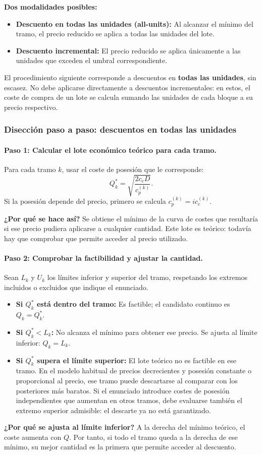 \documentclass[11pt,a4paper]{article}
\begin{document}
\textbf{Dos modalidades posibles:}
\begin{itemize}
    \item \textbf{Descuento en todas las unidades (all-units):} Al alcanzar el mínimo del tramo, el precio reducido se aplica a todas las unidades del lote.
    \item \textbf{Descuento incremental:} El precio reducido se aplica únicamente a las unidades que exceden el umbral correspondiente.
\end{itemize}
El procedimiento siguiente corresponde a descuentos en \textbf{todas las unidades}, sin escasez. No debe aplicarse directamente a descuentos incrementales: en estos, el coste de compra de un lote se calcula sumando las unidades de cada bloque a su precio respectivo.

\subsubsection{Disección paso a paso: descuentos en todas las unidades}
\paragraph{Paso 1: Calcular el lote económico teórico para cada tramo.}
Para cada tramo $k$, usar el coste de posesión que le corresponde:
\[
    Q_k^{*}=\sqrt{\frac{2c_eD}{c_p^{(k)}}}.
\]
Si la posesión depende del precio, primero se calcula $c_p^{(k)}=i c_c^{(k)}$.

\textbf{¿Por qué se hace así?} Se obtiene el mínimo de la curva de costes que resultaría si ese precio pudiera aplicarse a cualquier cantidad. Este lote es teórico: todavía hay que comprobar que permite acceder al precio utilizado.

\paragraph{Paso 2: Comprobar la factibilidad y ajustar la cantidad.}
Sean $L_k$ y $U_k$ los límites inferior y superior del tramo, respetando los extremos incluidos o excluidos que indique el enunciado.
\begin{itemize}
    \item \textbf{Si $Q_k^{*}$ está dentro del tramo:} Es factible; el candidato continuo es $Q_k=Q_k^{*}$.
    \item \textbf{Si $Q_k^{*}<L_k$:} No alcanza el mínimo para obtener ese precio. Se ajusta al límite inferior: $Q_k=L_k$.
    \item \textbf{Si $Q_k^{*}$ supera el límite superior:} El lote teórico no es factible en ese tramo. En el modelo habitual de precios decrecientes y posesión constante o proporcional al precio, ese tramo puede descartarse al comparar con los posteriores más baratos. Si el enunciado introduce costes de posesión independientes que aumentan en otros tramos, debe evaluarse también el extremo superior admisible: el descarte ya no está garantizado.
\end{itemize}
\textbf{¿Por qué se ajusta al límite inferior?} A la derecha del mínimo teórico, el coste aumenta con $Q$. Por tanto, si todo el tramo queda a la derecha de ese mínimo, su mejor cantidad es la primera que permite acceder al descuento.
\end{document}
